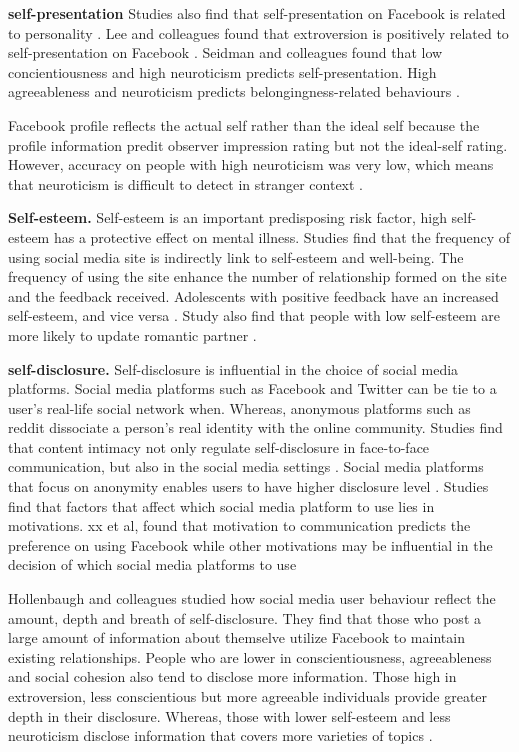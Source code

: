  \textbf{self-presentation} Studies also find that self-presentation on Facebook is related to personality \cite{seidman_self-presentation_2013}. Lee and colleagues found that extroversion is positively related to self-presentation on Facebook \cite{lee_personality_2014}.  Seidman and colleagues found that low concientiousness and high neuroticism predicts self-presentation. High agreeableness and neuroticism predicts belongingness-related behaviours \cite{seidman_self-presentation_2013}.

Facebook profile reflects the actual self rather than the ideal self because the profile information predit observer impression rating but not the ideal-self rating. However, accuracy on people with high neuroticism was very low, which means that neuroticism is difficult to detect in stranger context \cite{funder1999personality,back_facebook_2010}.

\textbf{Self-esteem.}
Self-esteem is an important predisposing risk factor, high self-esteem has a protective effect on mental illness. Studies find that the frequency of using social media site is indirectly link to self-esteem and well-being. The frequency of using the site enhance the number of relationship formed on the site and the feedback received. Adolescents with positive feedback have an increased self-esteem, and vice versa \cite{valkenburg2006friend}.  Study also find that people with low self-esteem are more likely to update romantic partner \cite{marshall_big_2015}.


\textbf{self-disclosure.}
Self-disclosure is influential in the choice of social media platforms. Social media platforms such as Facebook and Twitter can be tie to a user's real-life social network when. Whereas, anonymous platforms such as reddit dissociate a person's real identity with the online community. Studies find that content intimacy not only regulate self-disclosure in face-to-face communication, but also in the social media settings \cite{ma_anonymity_2016}. Social media platforms that focus on anonymity enables users to have higher disclosure level \cite{andalibi_announcing_2018}. Studies find that factors that affect which social media platform to use lies in motivations. xx et al, found that motivation to communication predicts the preference on using Facebook while other motivations may be influential in the decision of which social media platforms to use \cite{jenkins2012relationships}


Hollenbaugh and colleagues studied how social media user behaviour reflect the amount, depth and breath of self-disclosure. They find that those who post a large amount of information about themselve utilize Facebook to maintain existing relationships. People who are lower in conscientiousness, agreeableness and social cohesion also tend to disclose more information. Those high in extroversion, less conscientious but more agreeable individuals provide greater depth in their disclosure. Whereas, those with lower self-esteem and less neuroticism disclose information that covers more varieties of topics \cite{hollenbaugh_facebook_2014}.


